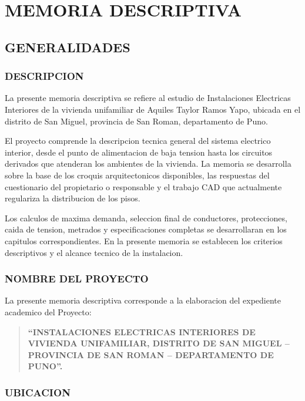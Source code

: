 \chapter*{MEMORIA DESCRIPTIVA}

\section{GENERALIDADES}

\subsection{DESCRIPCION}

La presente memoria descriptiva se refiere al estudio de Instalaciones Electricas Interiores de la vivienda unifamiliar de Aquiles Taylor Ramos Yapo, ubicada en el distrito de San Miguel, provincia de San Roman, departamento de Puno.

El proyecto comprende la descripcion tecnica general del sistema electrico interior, desde el punto de alimentacion de baja tension hasta los circuitos derivados que atenderan los ambientes de la vivienda. La memoria se desarrolla sobre la base de los croquis arquitectonicos disponibles, las respuestas del cuestionario del propietario o responsable y el trabajo CAD que actualmente regulariza la distribucion de los pisos.

Los calculos de maxima demanda, seleccion final de conductores, protecciones, caida de tension, metrados y especificaciones completas se desarrollaran en los capitulos correspondientes. En la presente memoria se establecen los criterios descriptivos y el alcance tecnico de la instalacion.

\subsection{NOMBRE DEL PROYECTO}

La presente memoria descriptiva corresponde a la elaboracion del expediente academico del Proyecto:

\begin{quote}
\textbf{``INSTALACIONES ELECTRICAS INTERIORES DE VIVIENDA UNIFAMILIAR, DISTRITO DE SAN MIGUEL -- PROVINCIA DE SAN ROMAN -- DEPARTAMENTO DE PUNO''.}
\end{quote}

\subsection{UBICACION}

